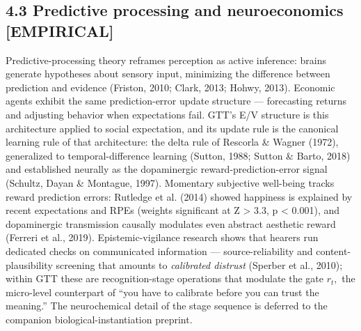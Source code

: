 \documentclass[11pt,twocolumn]{article}
\theoremstyle{gttdef}
\theoremstyle{gttplain}
\begin{document}
\subsection*{4.3 Predictive processing and neuroeconomics [EMPIRICAL]}

Predictive-processing theory reframes perception as active inference: brains generate hypotheses about sensory input, minimizing the difference between prediction and evidence (Friston, 2010; Clark, 2013; Hohwy, 2013). Economic agents exhibit the same prediction-error update structure --- forecasting returns and adjusting behavior when expectations fail. GTT's E/V structure is this architecture applied to social expectation, and its update rule is the canonical learning rule of that architecture: the delta rule of Rescorla \& Wagner (1972), generalized to temporal-difference learning (Sutton, 1988; Sutton \& Barto, 2018) and established neurally as the dopaminergic reward-prediction-error signal (Schultz, Dayan \& Montague, 1997). Momentary subjective well-being tracks reward prediction errors: Rutledge et al. (2014) showed happiness is explained by recent expectations and RPEs (weights significant at Z > 3.3, p < 0.001), and dopaminergic transmission causally modulates even abstract aesthetic reward (Ferreri et al., 2019). Epistemic-vigilance research shows that hearers run dedicated checks on communicated information --- source-reliability and content-plausibility screening that amounts to \emph{calibrated distrust} (Sperber et al., 2010); within GTT these are recognition-stage operations that modulate the gate $r_t,$ the micro-level counterpart of ``you have to calibrate before you can trust the meaning.'' The neurochemical detail of the stage sequence is deferred to the companion biological-instantiation preprint.
\end{document}
